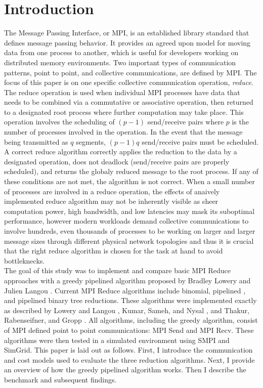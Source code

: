 \documentclass{article}
\begin{document}
\section{Introduction}
The Message Passing Interface, or MPI, is an established library standard that defines message
passing behavior. It provides an agreed upon model for moving data from one process to another, which
is useful for developers working on distributed memory environments. Two important types of 
communication patterns, point to point, and collective communications, are defined by MPI. The focus
of this paper is on one specific collective communication operation, \textit{reduce}. The reduce 
operation is used when individual MPI processes have data that needs to be combined via a commutative
or associative operation, then returned to a designated root process where further computation may 
take place. This operation involves the scheduling of $(p-1)$ send/receive pairs where $p$ is the 
number of processes involved in the operation. In the event that the message being transmitted as $q$
segments, $(p-1)q$ send/receive pairs must be scheduled. A correct reduce algorithm correctly 
applies the reduction to the data by a designated operation, does not deadlock (send/receive pairs
are properly scheduled), and returns the globaly reduced message to the root process. If any of 
these conditions are not met, the algorithm is not correct. When a small number of processes are 
involved in a reduce operation, the effects of anaively implemented reduce algorithm may not be 
inherently visible as sheer computation power, high bandwidth, and low latencies may mask its 
suboptimal performance, however modern workloads demand collective communications to involve 
hundreds, even thousands of processes to be working on larger and larger message sizes through 
different physical network topologies and thus it is crucial that the right reduce algorithm is 
chosen for the task at hand to avoid bottleknecks.\\    

The goal of this study was to implement and compare basic MPI Reduce approaches with a
greedy pipelined algorithm proposed by Bradley Lowery and Julien Langou \cite{Lowery-13}. Current 
MPI Reduce algorithms include binomial, pipelined , and pipelined binary tree 
reductions. These algorithms were implemented exactly as described by Lowery and Langou 
\cite{Lowery-13}, Kumar, Sameh, and Nysal \cite{Kumar-16}, and Thakur, Rabenseifner, and Gropp
\cite{Thakur-05}. All algorithms, including the greedy algorithm, consist of MPI defined point to 
point communications: MPI Send and MPI Recv. These algorithms were then tested in a simulated 
environment using SMPI and SimGrid. This paper is laid out as follows. First, I introduce the 
communication and cost models used to evaluate the three reduction algorithms. Next, I provide an 
overview of how the greedy pipelined algorithm works. Then I describe the benchmark and subsequent 
findings.
\end{document}
